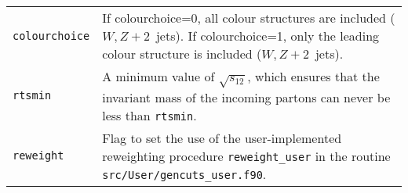 \begin{longtable}{p{1.5cm}p{12cm}}
		{\tt colourchoice} &
		If colourchoice=0, all colour structures are included ($W,Z+2$~jets).
		If colourchoice=1, only the leading 
		colour structure is included ($W,Z+2$~jets). \\
		
		{\tt rtsmin} &
		A minimum value of $\sqrt{s_{12}}$, which ensures that the invariant mass
		of the incoming partons can never be less than {\tt rtsmin}. \\
		
		

                \texttt{reweight} & Flag to set the use of
		the user-implemented reweighting procedure \texttt{reweight\_user}
		in the routine \texttt{src/User/gencuts\_user.f90}.\\
    		\hline
	\end{longtable}

